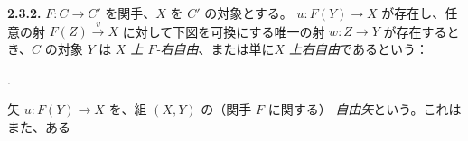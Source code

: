 \medskip\noindent\textbf{2.3.2.}\quad
{}
$F\colon C\longrightarrow C'$ を関手、$X$ を $C'$ の対象とする。
$u\colon F(Y)\longrightarrow X$ が存在し、任意の射
$F(Z)\xrightarrow{v}X$ に対して下図を可換にする唯一の射
$w\colon Z\longrightarrow Y$ が存在するとき、$C$ の対象 $Y$ は
\emph{$X$ 上 $F$-右自由}、または単に\emph{$X$ 上右自由}であるという：

\begin{center}
  \quad .
\end{center}

矢 $u\colon F(Y)\longrightarrow X$ を、組 $(X,Y)$ の（関手 $F$ に関する）
\emph{自由矢}という。これはまた、ある
\endgroup
